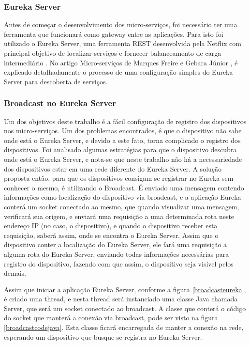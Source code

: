 \documentclass[journal]{IEEEtran}
\begin{document}
\subsubsection{Eureka Server}

Antes de começar o desenvolvimento dos micro-serviços, foi necessário ter uma ferramenta que funcionará como gateway entre as aplicações. Para isto foi utilizado o Eureka Server, uma ferramenta REST desenvolvida pela Netflix com principal objetivo de localizar serviços e fornecer balanceamento de carga intermediário \cite{eurekanetflix}. No artigo Micro-serviços de Marques Freire e Gebara Júnior \cite[p.~6]{freiregebaramicroservico}, é explicado detalhadamente o processo de uma configuração simples do Eureka Server para descoberta de serviços.

\subsubsection{Broadcast no Eureka Server}

Um dos objetivos deste trabalho é a fácil configuração de registro dos dispositivos nos micro-serviços. Um dos problemas encontrados, é que o dispositivo não sabe onde está o Eureka Server, e devido a este fato, torna complicado o registro dos dispositivos. Foi analisado algumas estratégias para que o dispositivo descubra onde está o Eureka Server, e nota-se que neste trabalho não há a necessariedade dos dispositivos estar em uma rede diferente do Eureka Server. A solução proposta então, para que os dispositivos consigam se registrar no Eureka sem conhecer o mesmo, é utilizando o Broadcast. É enviado uma mensagem contendo informações como localização do dispositivo via broadcast, e a aplicação Eureka conterá um socket conectado ao mesmo, que quando visualizar uma mensagem, verificará sua origem, e enviará uma requisição a uma determinada rota neste endereço IP (no caso, o dispositivo), e quando o dispositivo receber esta requisição, saberá assim, onde se encontra o Eureka Server. Assim que o dispositivo conter a localização do Eureka Server, ele fará uma requisição a alguma rota do Eureka Server, enviando todas informações necessárias para registro do dispositivo, fazendo com que assim, o dispositivo seja visível pelos demais.

Assim que iniciar a aplicação Eureka Server, conforme a figura \ref{broadcasteureka}, é criado uma thread, e nesta thread será instanciado uma classe Java chamada Server, que será um socket conectado ao broadcast. A classe que conterá o código do socket que manterá a conexão via broadcast, pode ser visto na figura \ref{broadcastcodejava}. Esta classe ficará encarregada de manter a conexão na rede, esperando um dispositivo que busque se registra no Eureka Server.
\end{document}
